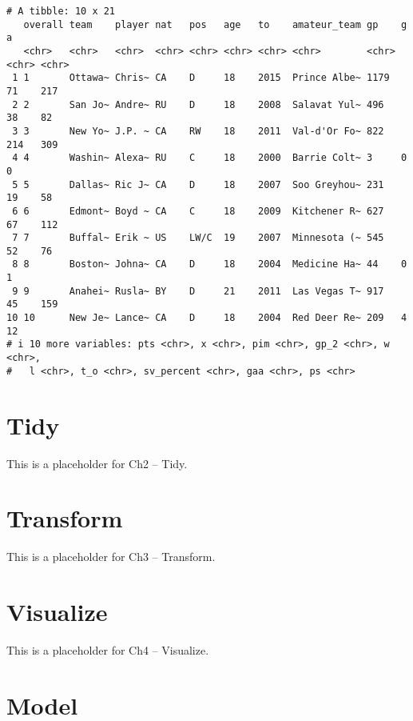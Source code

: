 \documentclass[
  letterpaper,
  DIV=11,
  numbers=noendperiod]{scrreprt}
\begin{document}
\begin{verbatim}
# A tibble: 10 x 21
   overall team    player nat   pos   age   to    amateur_team gp    g     a    
   <chr>   <chr>   <chr>  <chr> <chr> <chr> <chr> <chr>        <chr> <chr> <chr>
 1 1       Ottawa~ Chris~ CA    D     18    2015  Prince Albe~ 1179  71    217  
 2 2       San Jo~ Andre~ RU    D     18    2008  Salavat Yul~ 496   38    82   
 3 3       New Yo~ J.P. ~ CA    RW    18    2011  Val-d'Or Fo~ 822   214   309  
 4 4       Washin~ Alexa~ RU    C     18    2000  Barrie Colt~ 3     0     0    
 5 5       Dallas~ Ric J~ CA    D     18    2007  Soo Greyhou~ 231   19    58   
 6 6       Edmont~ Boyd ~ CA    C     18    2009  Kitchener R~ 627   67    112  
 7 7       Buffal~ Erik ~ US    LW/C  19    2007  Minnesota (~ 545   52    76   
 8 8       Boston~ Johna~ CA    D     18    2004  Medicine Ha~ 44    0     1    
 9 9       Anahei~ Rusla~ BY    D     21    2011  Las Vegas T~ 917   45    159  
10 10      New Je~ Lance~ CA    D     18    2004  Red Deer Re~ 209   4     12   
# i 10 more variables: pts <chr>, x <chr>, pim <chr>, gp_2 <chr>, w <chr>,
#   l <chr>, t_o <chr>, sv_percent <chr>, gaa <chr>, ps <chr>
\end{verbatim}


\chapter{Tidy}\label{tidy}

This is a placeholder for Ch2 -- Tidy.


\chapter{Transform}\label{transform}

This is a placeholder for Ch3 -- Transform.


\chapter{Visualize}\label{visualize}

This is a placeholder for Ch4 -- Visualize.


\chapter{Model}\label{model}
\end{document}
